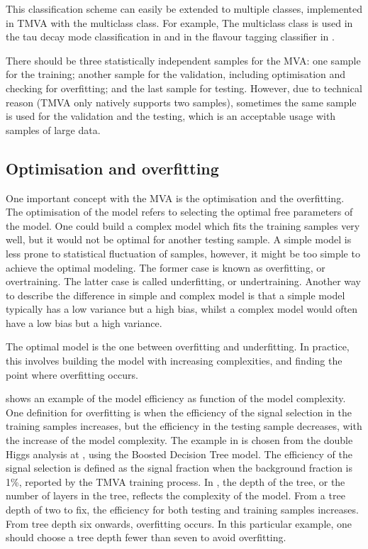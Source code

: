 This classification scheme can easily be extended to multiple classes, implemented in TMVA with the multiclass class. For example, The multiclass class is used in the tau decay mode classification in  and in the flavour tagging classifier in .

There should be three statistically independent samples for the MVA: one sample for the training; another sample for the validation, including optimisation and checking for overfitting; and the last sample for testing. However, due to technical reason (TMVA only natively supports two samples), sometimes the same sample is used for the validation and the testing, which is an acceptable usage with samples of large data.

\subsection{Optimisation and overfitting}
\label{sec:pandoraMVAoptimisation}

One important concept with the MVA is the optimisation and the overfitting. The optimisation of the model refers to selecting the optimal free parameters of the model. One could build a complex model which fits the training samples very well, but it would not be optimal for another testing sample. A simple model is less prone to statistical fluctuation of samples, however, it might be too simple to achieve the optimal modeling. The former case is known as overfitting, or overtraining. The latter case is called underfitting, or undertraining. Another way to describe the difference in simple and complex model is that a simple model typically has a low variance but a high bias, whilst a complex model would often have a low bias but a high variance.

The optimal model is the one between overfitting and underfitting. In practice, this involves building the model with increasing complexities, and finding the point where overfitting occurs.


 shows an example of the model efficiency as function of the model complexity. One definition for  overfitting is when the efficiency of the signal selection in the training samples increases, but the efficiency in the testing sample decreases, with the increase of the model complexity. The example in   is chosen from the double Higgs analysis at , using the Boosted Decision Tree model. The efficiency of the signal selection is defined as the signal fraction when the background fraction is 1\%, reported by the TMVA training process. In  , the depth of the tree, or the number of layers in the tree, reflects the complexity of the model. From a tree depth of two to fix, the efficiency for both testing and training samples increases. From tree depth six onwards, overfitting occurs. In this particular example, one should choose a tree depth fewer than seven to avoid overfitting.

